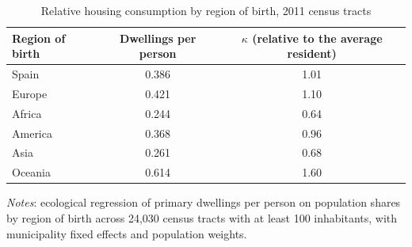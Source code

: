 \begin{table}[!htbp]\centering\small
\caption{Relative housing consumption by region of birth, 2011 census tracts}\label{tab:kappa}
\begin{tabular}{lcc}\toprule
Region of birth & Dwellings per person & $\kappa$ (relative to the average resident)\\\midrule
Spain & 0.386 & 1.01\\
Europe & 0.421 & 1.10\\
Africa & 0.244 & 0.64\\
America & 0.368 & 0.96\\
Asia & 0.261 & 0.68\\
Oceania & 0.614 & 1.60\\
\bottomrule\end{tabular}
\begin{minipage}{0.9\linewidth}\footnotesize\vspace{4pt}\textit{Notes}: ecological regression of primary dwellings per person on population shares by region of birth across 24,030 census tracts with at least 100 inhabitants, with municipality fixed effects and population weights.\end{minipage}\end{table}
